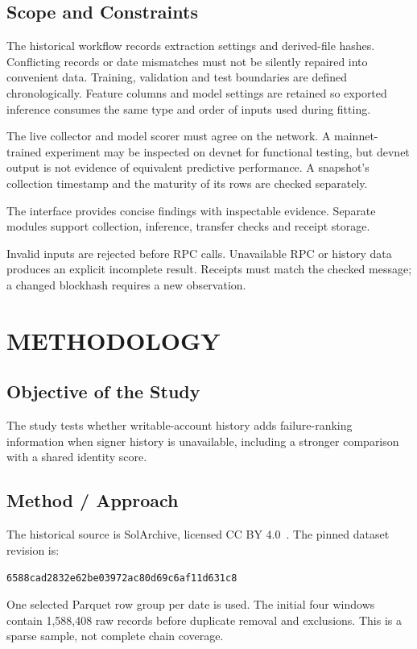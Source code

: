 \documentclass[12pt,a4paper,oneside]{report}
\begin{document}
\section{Scope and Constraints}
The historical workflow records extraction settings and derived-file hashes. Conflicting records or date mismatches must not be silently repaired into convenient data. Training, validation and test boundaries are defined chronologically. Feature columns and model settings are retained so exported inference consumes the same type and order of inputs used during fitting.

The live collector and model scorer must agree on the network. A mainnet-trained experiment may be inspected on devnet for functional testing, but devnet output is not evidence of equivalent predictive performance. A snapshot's collection timestamp and the maturity of its rows are checked separately.

The interface provides concise findings with inspectable evidence. Separate modules support collection, inference, transfer checks and receipt storage.


Invalid inputs are rejected before RPC calls. Unavailable RPC or history data produces an explicit incomplete result. Receipts must match the checked message; a changed blockhash requires a new observation.

\chapter{METHODOLOGY}
\section{Objective of the Study}
The study tests whether writable-account history adds failure-ranking information when signer history is unavailable, including a stronger comparison with a shared identity score.

\section{Method / Approach}
The historical source is SolArchive, licensed CC BY 4.0~\cite{archive}. The pinned dataset revision is:\par
{\small\texttt{6588cad2832e62be03972ac80d69c6af11d631c8}}\par
 One selected Parquet row group per date is used. The initial four windows contain 1,588,408 raw records before duplicate removal and exclusions. This is a sparse sample, not complete chain coverage.
\end{document}
